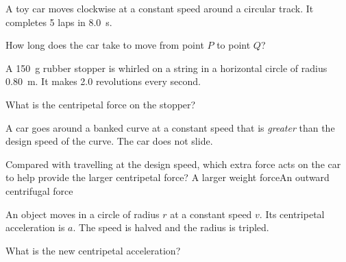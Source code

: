 \begin{quizq}{}
A toy car moves clockwise at a constant speed around a circular track. It completes 5 laps in
\qty{8.0}{s}.
\begin{center}
\end{center}
How long does the car take to move from point $P$ to point $Q$?
\end{quizq}

\begin{quizq}{}
A \qty{150}{g} rubber stopper is whirled on a string in a horizontal circle of radius \qty{0.80}{m}.
It makes 2.0 revolutions every second.

What is the centripetal force on the stopper?
\end{quizq}

\begin{quizq}{}
A car goes around a banked curve at a constant speed that is \emph{greater} than the design speed of
the curve. The car does not slide.

Compared with travelling at the design speed, which extra force acts on the car to help provide the
larger centripetal force?
  {A larger weight force}{An outward centrifugal force}
\end{quizq}

\begin{quizq}{}
An object moves in a circle of radius $r$ at a constant speed $v$. Its centripetal acceleration is
$a$. The speed is halved and the radius is tripled.

What is the new centripetal acceleration?
\end{quizq}

